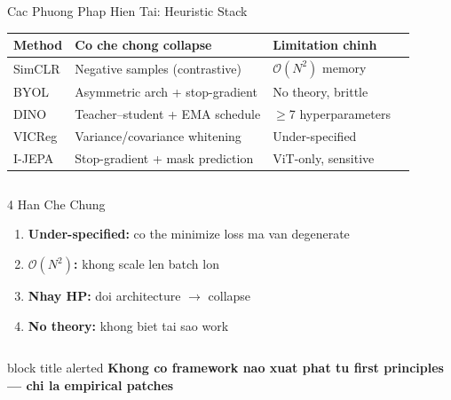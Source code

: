 \documentclass[aspectratio=169,12pt]{beamer}
\newcommand{\takeaway}[1]{%
  \vfill
  \begin{beamercolorbox}[sep=4pt,center,rounded=true]{block title alerted}
    \small\bfseries #1
  \end{beamercolorbox}
}
\begin{document}
\begin{frame}{Cac Phuong Phap Hien Tai: Heuristic Stack}
\begin{center}
\begin{tabular}{llll}
\toprule
\textbf{Method} & \textbf{Co che chong collapse} & \textbf{Limitation chinh} \\
\midrule
SimCLR  & Negative samples (contrastive)
        & \cellcolor{lightred}$\mathcal{O}(N^2)$ memory \\[2pt]
BYOL    & Asymmetric arch + stop-gradient
        & \cellcolor{lightred}No theory, brittle \\[2pt]
DINO    & Teacher--student + EMA schedule
        & \cellcolor{lightred}$\geq$7 hyperparameters \\[2pt]
VICReg  & Variance/covariance whitening
        & \cellcolor{lightred}Under-specified \\[2pt]
I-JEPA  & Stop-gradient + mask prediction
        & \cellcolor{lightred}ViT-only, sensitive \\
\bottomrule
\end{tabular}
\end{center}
\vspace{6pt}
\begin{columns}[t]
\begin{alertblock}{4 Han Che Chung}
\footnotesize
\begin{enumerate}
  \item \textbf{Under-specified:} co the minimize loss ma van degenerate
  \item \textbf{$\mathcal{O}(N^2)$:} khong scale len batch lon
  \item \textbf{Nhay HP:} doi architecture $\to$ collapse
  \item \textbf{No theory:} khong biet tai sao work
\end{enumerate}
\end{alertblock}
\end{columns}
\takeaway{Khong co framework nao xuat phat tu first principles --- chi la empirical patches}
\end{frame}
\end{document}
